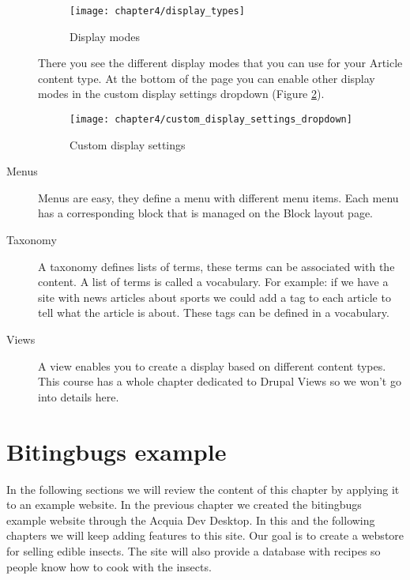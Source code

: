 \begin{description}
  	 \begin{figure}[H]
  	 	\centering
  	 	\texttt{[image: chapter4/display\_types]}
  	 	\caption{Display modes}
  	 	\label{fig:display_types}
  	 \end{figure}
  	 
  	 There you see the different display modes that you can use for your Article content type. At the bottom of the page you can enable other display modes in the custom display settings dropdown (Figure \ref{fig:custom_display_settings_dropdown}).
  	
  
  	\begin{figure}[H]
  		\centering
  		\texttt{[image: chapter4/custom\_display\_settings\_dropdown]}
  		\caption{Custom display settings}
  		\label{fig:custom_display_settings_dropdown}
  	\end{figure}
  	
  	\item[Menus] Menus are easy, they define a menu with different menu items. Each menu has a corresponding block that is managed on the Block layout page.
  	
  	\item[Taxonomy] A taxonomy defines lists of terms, these terms can be associated with the content. A list of terms is called a vocabulary. For example: if we have a site with news articles about sports we could add a tag to each article to tell what the article is about. These tags can be defined in a vocabulary. 
  	
  	\item[Views] A view enables you to create a display based on different content types. This course has a whole chapter dedicated to Drupal Views so we won't go into details here.
  	
  \end{description}
  
  \section{Bitingbugs example}
  
  In the following sections we will review the content of this chapter by applying it to an example website. In the previous chapter we created the bitingbugs example website through the Acquia Dev Desktop. In this and the following chapters we will keep adding features to this site. Our goal is to create a webstore for selling edible insects. The site will also provide a database with recipes so people know how to cook with the insects.
  
